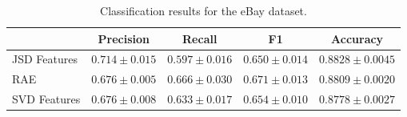\documentclass{article}
\begin{document}
\begin{table*}[t]
\label{tab:classification-results}
\vspace{-4mm}
\begin{center}
\begin{tabular}{|l|c|c|c|c|}
\hline
&Precision & Recall & F1 & Accuracy
\\ \hline 
JSD Features         &$\mathbf{0.714}\pm 0.015$&$0.597\pm 0.016$&$0.650\pm
0.014$& $\mathbf{0.8828}\pm 0.0045$\\
RAE             &$0.676\pm 0.005$&$\mathbf{0.666}\pm 0.030$&$\mathbf{0.671}\pm
0.013$&$0.8809\pm 0.0020$ \\
SVD Features             &$0.676\pm 0.008$&$0.633\pm 0.017$&$0.654\pm
0.010$&$0.8778\pm 0.0027$\\
\hline
\end{tabular}
\caption{Classification results for the eBay dataset.}
\end{center}
\end{table*}








\end{document}
